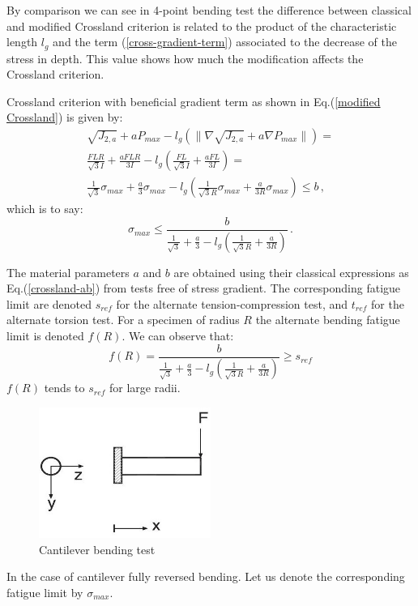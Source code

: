 \documentclass[3p,times,procedia,number]{elsarticle}
\begin{document}
By comparison we can see in 4-point bending test the difference between classical and modified Crossland criterion is related to the product of the characteristic length $l_g$ and the term (\ref{cross-gradient-term}) associated to the decrease of the stress in depth. This value shows how much the modification affects the Crossland criterion. 

\noindent Crossland criterion with beneficial gradient term as shown in Eq.(\ref{modified Crossland}) is given by:
\begin{equation}
\begin{split}
\sqrt{J_{2,a}}+aP_{max}-l_g(\parallel{\nabla\sqrt{J_{2,a}}}+a\nabla{P_{max}}\parallel)=\\ \frac{FLR}{\sqrt{3}I} +\frac{aFLR}{3I}-l_g(\frac{FL}{\sqrt{3}I}+\frac{aFL}{3I})=\\ \frac{1}{\sqrt{3}}\sigma_{max}+\frac{a}{3}\sigma_{max}-l_g(\frac{1}{\sqrt{3}R}\sigma_{max}+\frac{a}{3R}\sigma_{max})\leqslant b\, ,
\end{split}
\end{equation}
which is to say:
\begin{equation}
\sigma_{max}\leqslant\frac{b}{\frac{1}{\sqrt{3}}+\frac{a}{3}-l_g(\frac{1}{\sqrt{3}R}+\frac{a}{3R})}\, .
\end{equation}

The material parameters $a$ and $b$ are obtained using their classical expressions as Eq.(\ref{crossland-ab}) from tests free of stress gradient. The corresponding fatigue limit are denoted $s_{ref}$ for the alternate tension-compression test, and $t_{ref}$ for the alternate torsion test. For a specimen of radius $R$
the alternate bending fatigue limit is denoted $f(R)$.
We can observe that:
\begin{equation}
f(R)=\frac{b}{\frac{1}{\sqrt{3}}+\frac{a}{3}-l_g(\frac{1}{\sqrt{3}R}+\frac{a}{3R})}\geqslant s_{ref}
\label{crossland-fr}
\end{equation}
$f(R)$ tends to $s_{ref}$ for large radii.

\newpage
\begin{figure}[!h]
	\begin{center}
		\includegraphics[width=0.5\textwidth]{figures//fig3.jpg} 
		\caption{Cantilever bending test \cite{papadopoulos1996invariant}}
		\label{fig9}
	\end{center}
\end{figure}
In the case of cantilever fully reversed bending. Let us denote
the corresponding fatigue limit by $\sigma_{max}$.
\end{document}
